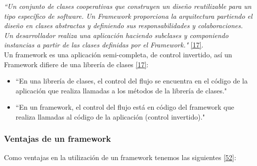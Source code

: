 \textit {``Un conjunto de clases cooperativas que construyen un diseño reutilizable para un tipo específico de software. Un Framework proporciona la arquitectura partiendo el diseño en clases abstractas y definiendo sus responsabilidades y colaboraciones. Un desarrollador realiza una aplicación haciendo subclases y componiendo instancias a partir de las clases definidas por el Framework."} \hyperlink{b17}{[17]}. \\

Un framework es una aplicación semi-completa, de control invertido, así un Framework difiere de una librería de clases \hyperlink{b17}{[17]}: 
\begin{itemize}
	\item ``En una librería de clases, el control del flujo se encuentra en el código de la aplicación que realiza llamadas a los métodos de la librería de clases."
	\item ``En un framework, el control del flujo está en código del framework que realiza llamadas al código de la aplicación (control invertido)."
\end{itemize}
\subsubsection {Ventajas de un framework}
Como ventajas en la utilización de un framework tenemos las siguientes \hyperlink{b52}{[52]}: 

